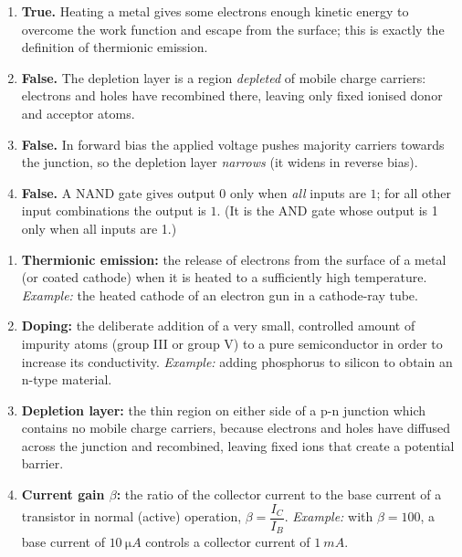 \documentclass[11pt]{article}
\begin{document}
\begin{corrige}
\begin{enumerate}
\item \textbf{True.} Heating a metal gives some electrons enough kinetic energy to overcome the work function and escape from the surface; this is exactly the definition of thermionic emission.
\item \textbf{False.} The depletion layer is a region \emph{depleted} of mobile charge carriers: electrons and holes have recombined there, leaving only fixed ionised donor and acceptor atoms.
\item \textbf{False.} In forward bias the applied voltage pushes majority carriers towards the junction, so the depletion layer \emph{narrows} (it widens in reverse bias).
\item \textbf{False.} A NAND gate gives output $0$ only when \emph{all} inputs are $1$; for all other input combinations the output is $1$. (It is the AND gate whose output is 1 only when all inputs are 1.)
\end{enumerate}
\end{corrige}

\begin{corrige}
\begin{enumerate}
\item \textbf{Thermionic emission:} the release of electrons from the surface of a metal (or coated cathode) when it is heated to a sufficiently high temperature. \emph{Example:} the heated cathode of an electron gun in a cathode-ray tube.
\item \textbf{Doping:} the deliberate addition of a very small, controlled amount of impurity atoms (group III or group V) to a pure semiconductor in order to increase its conductivity. \emph{Example:} adding phosphorus to silicon to obtain an n-type material.
\item \textbf{Depletion layer:} the thin region on either side of a p-n junction which contains no mobile charge carriers, because electrons and holes have diffused across the junction and recombined, leaving fixed ions that create a potential barrier.
\item \textbf{Current gain $\beta$:} the ratio of the collector current to the base current of a transistor in normal (active) operation, $\beta = \dfrac{I_C}{I_B}$. \emph{Example:} with $\beta = 100$, a base current of $\SI{10}{\micro A}$ controls a collector current of $\SI{1}{mA}$.
\end{enumerate}
\end{corrige}
\end{document}
